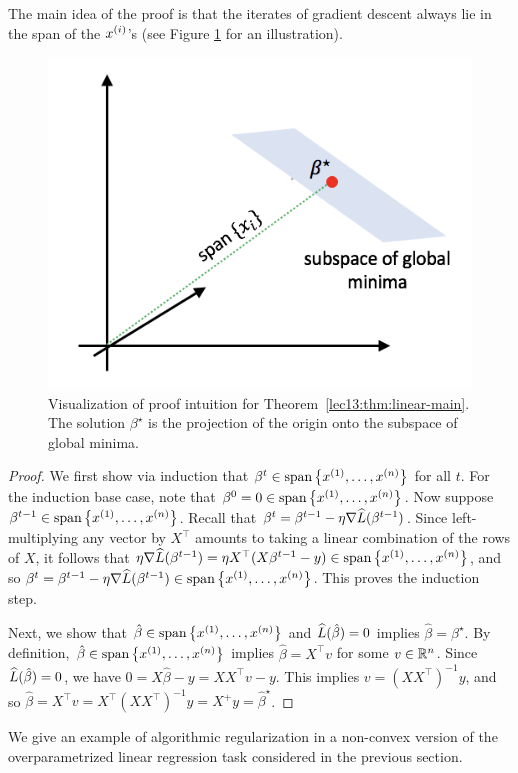 The main idea of the proof is that the iterates of gradient descent always lie in the span of the $x\sp{i}$'s (see Figure \ref{lec13:fig:1} for an illustration).

\begin{figure}
\centering
\includegraphics[width=.35\linewidth]{figures/subspace-global-min.png}
\caption{Visualization of proof intuition for Theorem~\ref{lec13:thm:linear-main}. The solution $\beta^\star$ is the projection of the origin onto the subspace of global minima.}
\label{lec13:fig:1}
\end{figure}

\begin{proof}
We first show via induction that $\beta^t \in \text{span}\l\{ x\sp{1}, \dots,x\sp{n} \r\}$ for all $t$. For the induction base case, note that $\beta^0 = 0 \in \text{span}\l\{ x\sp{1}, \dots,x\sp{n} \r\}$. Now suppose $\beta^{t-1} \in \text{span}\l\{ x\sp{1}, \dots,x\sp{n} \r\}$. Recall that $\beta^t = \beta^{t-1} - \eta \nabla \hatL(\beta^{t-1})$. Since left-multiplying any vector by $X^\top$ amounts to taking a linear combination of the rows of $X$, it follows that $\eta \nabla \hatL(\beta^{t-1}) = \eta X^\top(X\beta^{t-1} - y) \in \text{span}\l\{ x\sp{1}, \dots,x\sp{n} \r\}$, and so $\beta^t = \beta^{t-1} - \eta \nabla \hatL(\beta^{t-1}) \in \text{span}\l\{ x\sp{1}, \dots,x\sp{n} \r\}$. This proves the induction step.

Next, we show that $\hat \beta \in \text{span}\l\{ x\sp{1}, \dots,x\sp{n} \r\}$ and $\hatL(\hat \beta) = 0$ implies $\hat \beta = \beta^\star$. By definition, $\hat \beta \in \text{span}\l\{ x\sp{1}, \dots,x\sp{n} \r\}$ implies $\hat \beta = X^\top v$ for some $v \in \bbR^n$. Since $\hatL(\hat \beta) = 0$, we have $0 = X\hat \beta - y = X X^\top v - y$. This implies $v = (X X^\top)^{-1}y$, and so $\hat \beta = X^\top v = X^\top (X X^\top)^{-1} y = X^+ y = \hat \beta^\star$.
\end{proof}

We give an example of algorithmic regularization in a non-convex version of the overparametrized linear regression task considered in the previous section.

